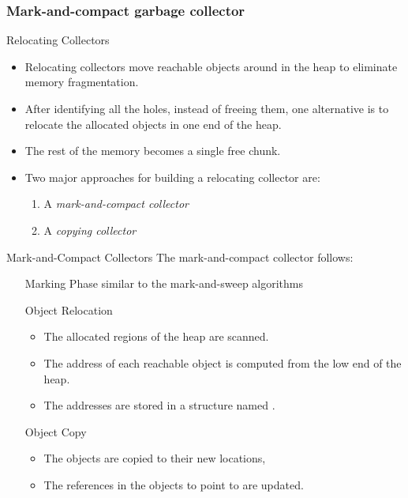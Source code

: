 \begin{bibunit}[apalike]
\subsubsection{Mark-and-compact garbage collector}

\tableofcontentslide[sections={4-6},sectionstyle={show/shaded},subsectionstyle={show/shaded/hide},subsubsectionstyle={show/shaded/hide/hide}]

\begin{frame}{Relocating Collectors}
	\begin{itemize}
	\item Relocating collectors move reachable objects around in the heap to eliminate memory fragmentation.
	\item After identifying all the holes, instead of freeing them, one alternative is to relocate the allocated objects in one end of the heap.
	\item The rest of the memory becomes a single free chunk.
	\vfill
	\item Two major approaches for building a relocating collector are:
		\begin{enumerate}
		\item A \emph{mark-and-compact collector}
		\item A \emph{copying collector}
		\end{enumerate}
	\end{itemize}
\end{frame}

\begin{frame}{Mark-and-Compact Collectors}
	The mark-and-compact collector follows:
	\vfill
	\begin{enumerate}
	\item[Marking Phase] similar to the mark-and-sweep algorithms
	\vfill
	\item[Object Relocation] \begin{itemize}
		\item The allocated regions of the heap are scanned.
		\item The address of each reachable object is computed from the low end of the heap.
		\item The addresses are stored in a structure named .
		\end{itemize}
	\vfill
	\item[Object Copy] \begin{itemize}
		\item The objects are copied to their new locations,
		\item The references in the objects to point to are updated.
		\end{itemize}
	\end{enumerate}
\end{frame}


\end{bibunit}
